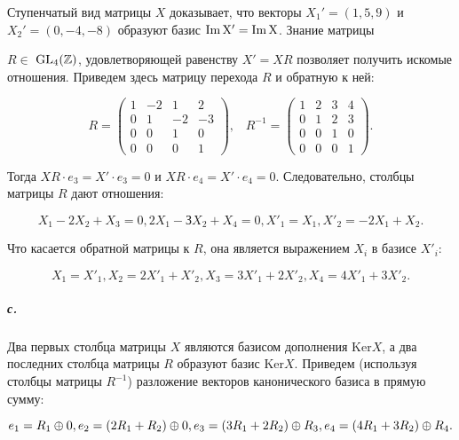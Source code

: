 \documentclass{mai_book}
\begin{document}
{\noindent Ступенчатый вид матрицы $X$ доказывает, что векторы $X_{1}' = (1,5,9)$
и $X_{2}' = (0,-4,-8)$ образуют базис $\rm{Im}\,{X'} = \rm{Im}\,{X}$. Знание матрицы





\noindent $R \in$ $\rm{GL_{4}}(\mathbb {Z})$, удовлетворяющей равенству $X' = XR$ позволяет получить
искомые отношения. Приведем здесь матрицу перехода $R$ и обратную
к ней:

\begin{equation*}
R = {\begin{pmatrix} 1  & -2  &  1  &  2 \\
                     0  &  1  & -2  & -3 \\
                     0  &  0  &  1  &  0 \\
                     0  &  0  &  0  &  1 
     \end{pmatrix}},\;\;\;
R^{-1} = {\begin{pmatrix} 1 & 2 & 3 & 4 \\ 0 & 1 & 2 & 3 \\ 0 & 0 & 1 & 0 \\ 0 & 0 & 0 & 1 \end{pmatrix}}.
\end{equation*}

\noindent Тогда $XR \cdot e_3 = X' \cdot e_3 = 0$ и $XR \cdot e_4 = X' \cdot e_4 = 0$. Следовательно,
столбцы матрицы $R$ дают отношения:

\begin{equation*}
X_1 - 2X_2 + X_3 = 0, 2X_1 - ЗX_2 + X_4 = 0, X'_{1} = X_1, X'_{2} = -2X_1 + X_2.
\end{equation*}

\noindent Что касается обратной матрицы к $R$, она является выражением $X_i$ в
базисе $X'_{i}$:

\begin{equation*}
X_1 = X'_{1}, X_2 = 2X'_{1} + X'_{2}, X_3 = 3X'_{1} + 2 X'_{2}, X_4 = 4X'_{1} + 3X'_{2}.
\end{equation*}

\subparagraph{с.} Два первых столбца матрицы $X$ являются базисом дополнения
Ker{$X$}, а два последних столбца матрицы $R$ образуют базис Ker{$X$}. Приведем (используя столбцы матрицы $R^{-1}$) разложение векторов канонического базиса в прямую сумму:

\begin{equation*}
e_1 = R_1 \oplus 0, e_2 = (2R_1 + R_2) \oplus 0, \\
e_3 = (3R_1 + 2R_2) \oplus R_{3}, e_4 = (4R_1 + 3R_2) \oplus R_4.
\end{equation*}

}
\end{document}

